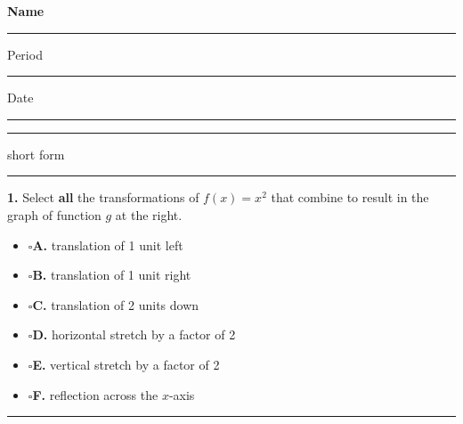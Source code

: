 \documentclass[11pt]{article}
\newcommand{\checkbox}{$\square$\;}
\begin{document}
\noindent\textbf{Name}\; \rule{6cm}{0.4pt} \hfill Period \rule{1.2cm}{0.4pt} \quad Date \rule{2.2cm}{0.4pt}

\vspace{4pt}\noindent\rule{\textwidth}{0.6pt}

\vspace{2pt} \hfill {\small short form}

\vspace{4pt}\noindent\rule{\textwidth}{0.6pt}

\vspace{6pt}
\begin{minipage}[t]{0.56\textwidth}
\textbf{1.} Select \textbf{all} the transformations of $f(x)=x^2$ that combine to result in the graph of function $g$ at the right.

\vspace{4pt}
\begin{itemize}[leftmargin=1.2em, itemsep=5pt]
\item[] \checkbox \textbf{A.} translation of 1 unit left
\item[] \checkbox \textbf{B.} translation of 1 unit right
\item[] \checkbox \textbf{C.} translation of 2 units down
\item[] \checkbox \textbf{D.} horizontal stretch by a factor of 2
\item[] \checkbox \textbf{E.} vertical stretch by a factor of 2
\item[] \checkbox \textbf{F.} reflection across the $x$-axis
\end{itemize}
\end{minipage}\hfill
\begin{minipage}[t]{0.42\textwidth}
\vspace{-6pt}
\end{minipage}

\vspace{10pt}\noindent\rule{\textwidth}{0.4pt}
\end{document}
